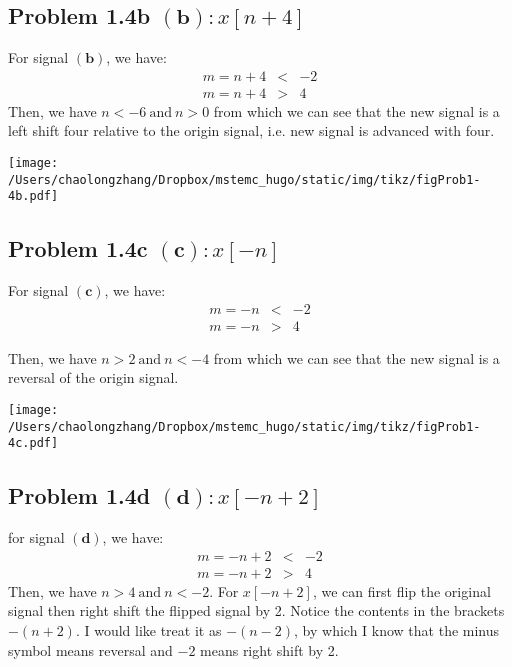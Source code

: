 \documentclass[koma,a4paper,utopia,12pt,listings-color,microtype,paralist,colorlinks,urlcolor=red]{org-article}
\begin{document}
\subsection{Problem 1.4b \(\mathbf{(b)}:x[n+4]\)}
\label{sec:org9176217}

For signal \(\mathbf{(b)}\), we have:
\begin{eqnarray*}
m=n+4&<&-2 \\
m=n+4&>&4
\end{eqnarray*}
Then, we have \(n<-6\ \mathrm{and}\ n>0\) from which we can see that the new
signal is a left shift four relative to the origin signal, i.e. new
signal is advanced with four.

\begin{center}
\texttt{[image: /Users/chaolongzhang/Dropbox/mstemc\_hugo/static/img/tikz/figProb1-4b.pdf]}
\end{center}


\subsection{Problem 1.4c \(\mathbf{(c)}: x[-n]\)}
\label{sec:org71c1184}

For signal \(\mathbf{( c )}\), we have:
\begin{eqnarray*}
m=-n&<&-2 \\
m=-n&>&4
\end{eqnarray*}

Then, we have \(n>2\ \mathrm{and} \ n<-4\) from which we can see that the new
signal is a reversal of the origin signal.

\begin{center}
\texttt{[image: /Users/chaolongzhang/Dropbox/mstemc\_hugo/static/img/tikz/figProb1-4c.pdf]}
\end{center}


\subsection{Problem 1.4d \(\mathbf{(d)}: x[-n+2]\)}
\label{sec:org0b89113}

for signal \(\mathbf{(d)}\), we have:
\begin{eqnarray*}
m=-n+2&<&-2 \\
m=-n+2&>&4
\end{eqnarray*}
Then, we have \(n>4\ \mathrm{and}\ n<-2\). For \(x[-n+2]\), we can first
flip the original signal then right shift the flipped signal by 2. Notice the
contents in the brackets \(-(n+2)\). I would like treat it as \(-(n-2)\), by
which I know that the minus symbol means reversal and \(-2\) means right
shift by 2.
\end{document}
